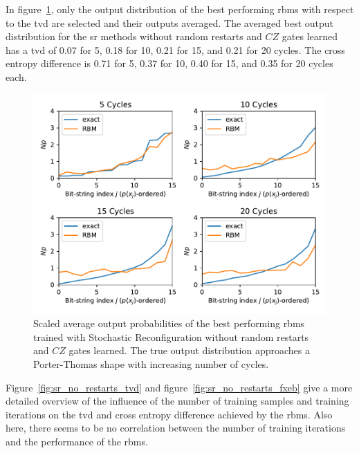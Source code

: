In figure~\ref{fig:sr_no_restarts_bestPDF}, only the output distribution of the best performing \gls{rbm}s with respect to the 
\gls{tvd} are selected and their outputs averaged. The averaged best output distribution for the \gls{sr} methods without 
random restarts and $CZ$ gates learned has a \gls{tvd} of 0.07 for 5, 0.18 for 10, 0.21 for 15, and 0.21 for 20 
cycles. The cross entropy difference is 0.71 for 5, 0.37 for 10, 0.40 for 15, and 0.35 for 20 cycles each. 

\begin{figure}[H]
  \centering
  \includegraphics[width=\textwidth]{figures/results/sr-no-restarts-learned/avgBestPDF.pdf}
  \caption[Scaled Average Output Probabilities of Best Performing RBMs Trained with Stochastic Reconfiguration without Random Restarts and $CZ$ Gates Learned]{
    Scaled average output probabilities of the best performing \gls{rbm}s trained with Stochastic Reconfiguration without random restarts and $CZ$ gates learned. The true 
    output distribution approaches a Porter-Thomas shape with increasing number of cycles.}
  \label{fig:sr_no_restarts_bestPDF}
\end{figure}

Figure~\ref{fig:sr_no_restarts_tvd} and figure~\ref{fig:sr_no_restarts_fxeb} give a more detailed overview of the influence of the 
number of training samples and training iterations on the \gls{tvd} and cross entropy difference achieved by 
the \gls{rbm}s. Also here, there seems to be no correlation between the number of training
iterations and the performance of the \gls{rbm}s. 

